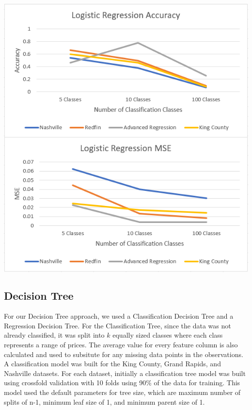 \documentclass[10pt]{article}
\begin{document}
\begin{multicols}{2}
		\begin{center}
	        \captionsetup{type=figure}
			\includegraphics[scale=0.6]{Images/LogisticRegressionMSEAccuracy} \\
			\label{fig:logr_MSE_Accuracy}
		\end{center}
			
		\subsection{Decision Tree}
		For our Decision Tree approach, we used a Classification Decision Tree and a Regression Decision Tree. For the Classification Tree, since the data was not already classified, it was split into \(k\) equally sized classes where each class represents a range of prices. The average value for every feature column is also calculated and used to subsitute for any missing data points in the observations. A classification model was built for the King County, Grand Rapids, and Nashville datasets. For each dataset, initially a classification tree model was built using crossfold validation with 10 folds using 90\% of the data for training. This model used the default parameters for tree size, which are maximum number of splits of n-1, minimum leaf size of 1, and minimum parent size of 1. 


\end{multicols}
\end{document}
